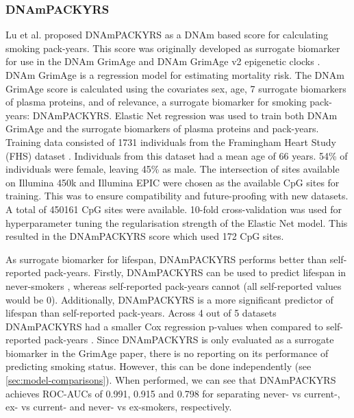 \documentclass{article} %
\begin{document}
\subsubsection{DNAmPACKYRS} \label{sec:dnampackyrs}
Lu et al. \cite{lu2019dna} proposed DNAmPACKYRS as a DNAm based score for calculating smoking pack-years. This score was originally developed as surrogate biomarker for use in the DNAm GrimAge \cite{lu2019dna} and DNAm GrimAge v2 epigenetic clocks \cite{lu2022dna}. DNAm GrimAge is a regression model for estimating mortality risk. The DNAm GrimAge score is calculated using the covariates sex, age, 7 surrogate biomarkers of plasma proteins, and of relevance, a surrogate biomarker for smoking pack-years: DNAmPACKYRS. Elastic Net regression was used to train both DNAm GrimAge and the surrogate biomarkers of plasma proteins and pack-years. Training data consisted of 1731 individuals from the Framingham Heart Study (FHS) dataset \cite{doi:10.2105/AJPH.41.3.279}. Individuals from this dataset had a mean age of 66 years. 54\% of individuals were female, leaving 45\% as male. The intersection of sites available on Illumina 450k and Illumina EPIC were chosen as the available CpG sites for training. This was to ensure compatibility and future-proofing with new datasets. A total of \num{450161} CpG sites were available. 10-fold cross-validation was used for hyperparameter tuning the regularisation strength of the Elastic Net model. This resulted in the DNAmPACKYRS score which used 172 CpG sites.

As surrogate biomarker for lifespan, DNAmPACKYRS performs better than self-reported pack-years. Firstly, DNAmPACKYRS can be used to predict lifespan in never-smokers \cite{lu2019dna}, whereas self-reported pack-years cannot (all self-reported values would be 0). Additionally, DNAmPACKYRS is a more significant predictor of lifespan than self-reported pack-years. Across 4 out of 5 datasets DNAmPACKYRS had a smaller Cox regression p-values when compared to self-reported pack-years \cite{lu2019dna}. Since DNAmPACKYRS is only evaluated as a surrogate biomarker in the GrimAge paper, there is no reporting on its performance of predicting smoking status. However, this can be done independently (see \ref{sec:model-comparisons}). When performed, we can see that DNAmPACKYRS achieves ROC-AUCs of 0.991, 0.915 and 0.798 for separating never- vs current-, ex- vs current- and never- vs ex-smokers, respectively.
\end{document}

